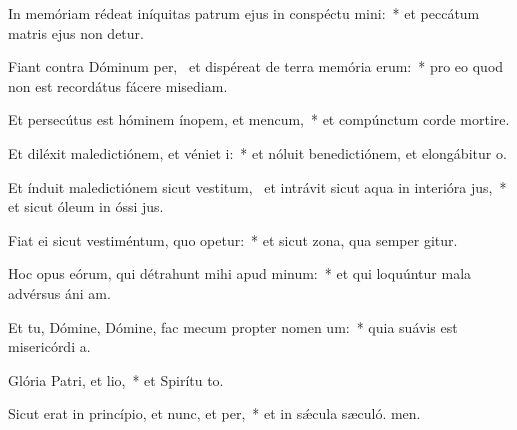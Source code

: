 \item In memóriam rédeat iníquitas patrum ejus in conspéctu mini:~* et peccátum matris ejus non detur.
\item Fiant contra Dóminum per,~\pscross{} et dispéreat de terra memória erum:~* pro eo quod non est recordátus fácere misediam.
\item Et persecútus est hóminem ínopem, et mencum,~* et compúnctum corde mortire.
\item Et diléxit maledictiónem, et véniet i:~* et nóluit benedictiónem, et elongábitur  o.
\item Et índuit maledictiónem sicut vestitum,~\pscross{} et intrávit sicut aqua in interióra jus,~* et sicut óleum in óssi jus.
\item Fiat ei sicut vestiméntum, quo opetur:~* et sicut zona, qua semper gitur.
\item Hoc opus eórum, qui détrahunt mihi apud minum:~* et qui loquúntur mala advérsus áni am.
\item Et tu, Dómine, Dómine, fac mecum propter nomen um:~* quia suávis est misericórdi a.
\item Glória Patri, et lio,~* et Spirítu to.
\item Sicut erat in princípio, et nunc, et per,~* et in sǽcula sæculó. men.
